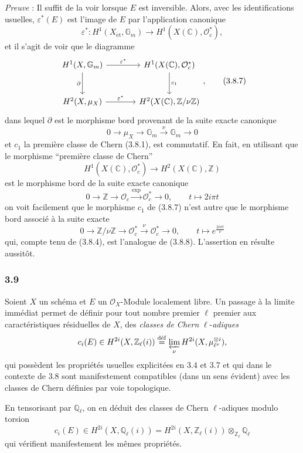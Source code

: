 \documentclass[11pt]{article}
\providecommand{\et}{\mathrm{\acute{e}t}}
\providecommand{\et}{\acute{e}t}
\begin{document}
\emph{Preuve} : Il suffit de la voir lorsque $E$ est inversible. Alors, avec les identifications usuelles, $\varepsilon^*(E)$ est l'image de $E$ par l'application canonique
\[
\varepsilon^*:H^1(X_{\et},\mathbb G_m)\to H^1(X(\mathbb C),\mathcal O_c^*),
\tag{3.8.6}
\]
et il s'agit de voir que le diagramme
\[
\begin{tikzcd}[column sep=large,row sep=large]
H^1(X,\mathbb G_m) \arrow[r,"\varepsilon^*"] \arrow[d,"\partial"'] &
H^1(X(\mathbb C),\mathcal O_c^*) \arrow[d,"c_1"]\\
H^2(X,\mu_X) \arrow[r,"\varepsilon^*"] &
H^2(X(\mathbb C),\mathbb Z/\nu\mathbb Z)
\end{tikzcd},
\tag{3.8.7}
\]
dans lequel $\partial$ est le morphisme bord provenant de la suite exacte canonique
\[
0\to \mu_X\to\mathbb G_m\xrightarrow{\nu}\mathbb G_m\to0
\tag{3.8.8}
\]
et $c_1$ la première classe de Chern (3.8.1), est commutatif. En fait, en utilisant que le morphisme ``première classe de Chern''
\[
H^1(X(\mathbb C),\mathcal O_c^*)\to H^2(X(\mathbb C),\mathbb Z)
\]
est le morphisme bord de la suite exacte canonique
\[
0\to\mathbb Z\to\mathcal O_c\xrightarrow{\exp}\mathcal O_c^*\to0,
\qquad
t\mapsto 2i\pi t
\]
on voit facilement que le morphisme $c_1$ de (3.8.7) n'est autre que le morphisme bord associé à la suite exacte
\[
0\to\mathbb Z/\nu\mathbb Z\to\mathcal O_c^*\xrightarrow{\nu}\mathcal O_c^*\to0,
\qquad
t\mapsto e^{\frac{2i\pi t}{\nu}}
\]
qui, compte tenu de (3.8.4), est l'analogue de (3.8.8). L'assertion en résulte aussitôt.

\subsubsection*{3.9}
Soient $X$ un schéma et $E$ un $\mathcal O_X$-Module localement libre. Un passage à la limite immédiat permet de définir pour tout nombre premier $\ell$ premier aux caractéristiques résiduelles de $X$, des \emph{classes de Chern} $\ell$-\emph{adiques}
\[
c_i(E)\in H^{2i}(X,\mathbb Z_\ell(i))
\stackrel{\mathrm{d\acute{e}f}}{=}\varprojlim_\nu H^{2i}(X,\mu_{\ell^\nu}^{\otimes i}),
\]
qui
possèdent les propriétés usuelles explicitées en 3.4 et 3.7 et qui dans le contexte de 3.8 sont manifestement compatibles (dans un sens évident) avec les classes de Chern définies par voie topologique.

En tensorisant par $\mathbb Q_\ell$, on en déduit des classes de Chern $\ell$-adiques modulo torsion
\[
c_i(E)\in H^{2i}(X,\mathbb Q_\ell(i))
=H^{2i}(X,\mathbb Z_\ell(i))\otimes_{\mathbb Z_\ell}\mathbb Q_\ell
\]
qui vérifient manifestement les mêmes propriétés.
\end{document}
